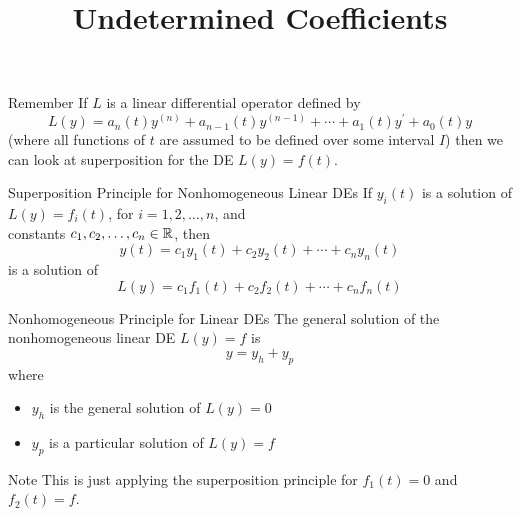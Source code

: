 \documentclass{beamer}
\title[MATH 2250 - Section 4.4]{Undetermined Coefficients}
\begin{document}
\begin{frame}
  \titlepage
\end{frame}

\begin{frame}
\begin{block}{Remember}
If $L$ is a linear differential operator defined by
\begin{equation*}
L(y)=a_n(t)y^{(n)}+a_{n-1}(t)y^{(n-1)}+\cdots+a_1(t)y^\prime+a_0(t)y
\end{equation*}
(where all functions of $t$ are assumed to be defined over some interval $I$) then we can look at superposition for the DE $L(y)=f(t)$.
\end{block}\pause

\begin{block}{Superposition Principle for Nonhomogeneous Linear DEs}
If $y_i(t)$ is a solution of $L(y)=f_i(t)$, for $i=1,2,\ldots,n$, and\\ constants $c_1,c_2,\ldots,c_n\in\mathbb{R}$, then
\begin{equation*}
y(t)=c_1 y_1(t) + c_2 y_2(t) + \cdots + c_n y_n(t)
\end{equation*}
is a solution of
\begin{equation*}
L(y)=c_1 f_1(t) + c_2 f_2(t) + \cdots + c_n f_n(t)
\end{equation*}
\end{block}
\end{frame}

\begin{frame}
\begin{block}{Nonhomogeneous Principle for Linear DEs}
The general solution of the nonhomogeneous linear DE $L(y)=f$ is
\begin{equation*}
y=y_h+y_p
\end{equation*}
where
\begin{itemize}
\item $y_h$ is the general solution of $L(y)=0$
\item $y_p$ is a particular solution of $L(y)=f$
\end{itemize}
\end{block}\pause

\begin{block}{Note}
This is just applying the superposition principle for $f_1(t)=0$ and $f_2(t)=f$.
\end{block}
\end{frame}
\end{document}
